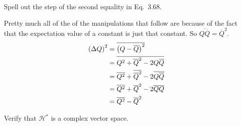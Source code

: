 \documentclass[boxes,pages]{homework}
\makeatletter
\numberwithin{@problem}{section}
\makeatother
\begin{document}
\begin{problem}
Spell out the step of the second equality in Eq.\ 3.68.
\end{problem}

\begin{solution}
	Pretty much all of the of the manipulations that follow are because of the fact that the expectation value of a constant is just that constant. So $\overline{Q\overline{Q}} = \overline{Q}^2$.
	\begin{align*}
		\qty(\Delta Q)^2 & = \overline{\qty(Q - \overline{Q})^2}                                    \\
		                 & = \overline{Q^2 + \overline{Q}^2 - 2Q\overline{Q}}                       \\
		                 & = \overline{Q^2} + \overline{\overline{Q}^2} - 2\overline{Q\overline{Q}} \\
		                 & = \overline{Q^2} + \overline{Q}^2 - 2\overline{Q}\overline{Q}            \\
		                 & = \overline{Q^2} - \overline{Q}^2
	\end{align*}
\end{solution}

\begin{problem}
Verify that $\mathcal{H}^*$ is a complex vector space.
\end{problem}
\end{document}
